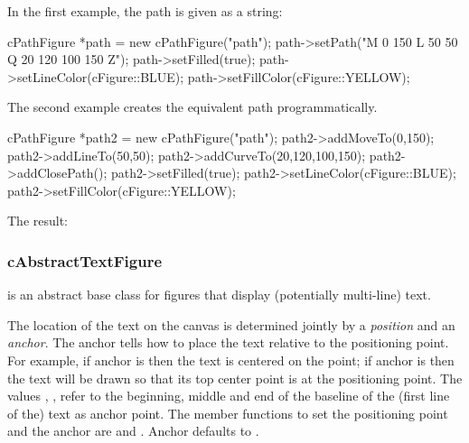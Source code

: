 In the first example, the path is given as a string:


\begin{cpp}
cPathFigure *path = new cPathFigure("path");
path->setPath("M 0 150 L 50 50 Q 20 120 100 150 Z");
path->setFilled(true);
path->setLineColor(cFigure::BLUE);
path->setFillColor(cFigure::YELLOW);
\end{cpp}


The second example creates the equivalent path programmatically.

\begin{cpp}
cPathFigure *path2 = new cPathFigure("path");
path2->addMoveTo(0,150);
path2->addLineTo(50,50);
path2->addCurveTo(20,120,100,150);
path2->addClosePath();
path2->setFilled(true);
path2->setLineColor(cFigure::BLUE);
path2->setFillColor(cFigure::YELLOW);
\end{cpp}


The result:

\begin{center}

\end{center}

\subsubsection{cAbstractTextFigure}
\label{sec:graphics:abstracttextfigure}

 is an abstract base class for figures that
display (potentially multi-line) text.

The location of the text on the canvas is determined jointly by a
\textit{position} and an \textit{anchor}. The anchor tells how to
place the text relative to the positioning point. For example,
if anchor is  then the text is centered on the point;
if anchor is  then the text will be drawn so that its top
center point is at the positioning point. The values
, ,
 refer to the beginning, middle and end of the
baseline of the (first line of the) text as anchor point. The member
functions to set the positioning point and the anchor are
 and . Anchor defaults to
.


